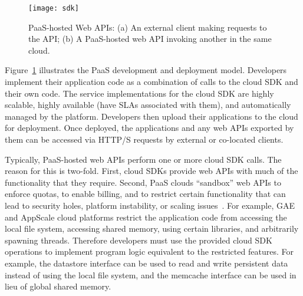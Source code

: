 
\begin{figure}
\centering
\texttt{[image: sdk]}
\caption{PaaS-hosted Web APIs: (a) An external client making requests
to the API;
(b) A PaaS-hosted web API invoking another in the same cloud.
\label{fig:cloud_app_model}
}
\vspace{-0.1in}
\end{figure}

Figure~\ref{fig:cloud_app_model} illustrates the PaaS development and deployment model.
Developers implement their application code as a combination of calls to the
cloud SDK and their own code.  The service implementations for the 
cloud SDK are highly scalable, highly available (have SLAs associated with them),
and automatically managed by the platform. Developers then
upload their applications to the cloud for deployment.
Once deployed, the applications and any web APIs exported by them can be accessed 
via HTTP/S requests by external or co-located clients.

Typically, PaaS-hosted web APIs perform one or more
cloud SDK calls.  The reason for this is two-fold.  First, 
cloud SDKs provide web APIs with much of the functionality that they require.
Second, PaaS clouds ``sandbox'' web APIs to enforce quotas, to enable billing,
and to restrict certain functionality
that can lead to security holes, platform instability, or scaling issues~\cite{gae-sandbox}.
For example, GAE and AppScale cloud platforms restrict the application code
from accessing the local file system, accessing shared memory, using certain libraries,
and arbitrarily spawning threads. Therefore developers must use the provided cloud 
SDK operations to implement program logic equivalent to the restricted features. For
example, the datastore interface can be used to read and write persistent data instead of 
using the local file system, and the memcache interface can be used in lieu of global
shared memory.

